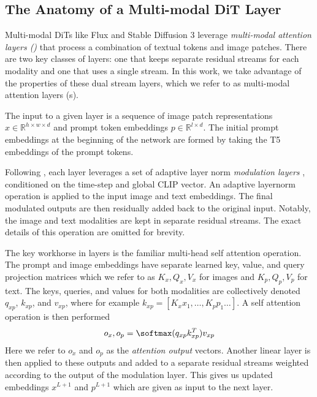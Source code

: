 
\subsection{The Anatomy of a Multi-modal DiT Layer}

Multi-modal DiTs like Flux and Stable Diffusion 3 leverage \textit{multi-modal attention layers (\layername)} that process a combination of textual tokens and image patches. There are two key classes of layers: one that keeps separate residual streams for each modality and one that uses a single stream. In this work, we take advantage of the properties of these dual stream layers, which we refer to as multi-modal attention layers (\layername s). 

The input to a given layer is a sequence of image patch representations $x \in \mathbb{R}^{h \times w \times d}$ and prompt token embeddings $p \in \mathbb{R}^{l \times d}$. The initial prompt embeddings at the beginning of the network are formed by taking the T5 \cite{raffel_exploring_2023} embeddings of the prompt tokens.

Following \cite{peebles_scalable_2023}, each \layername{} layer leverages a set of adaptive layer norm \textit{modulation layers}  \cite{xu_understanding_2019}, conditioned on the time-step and global CLIP vector. An adaptive layernorm operation is applied to the input image and text embeddings. 
The final modulated outputs are then residually added back to the original input. Notably, the image and text modalities are kept in separate residual streams. The exact details of this operation are omitted for brevity. 

The key workhorse in \layername{} layers is the familiar multi-head self attention operation. The prompt and image embeddings have separate learned key, value, and query projection matrices which we refer to as $K_x, Q_x, V_x$ for images and $K_p, Q_p, V_p$ for text. The keys, queries, and values for both modalities are collectively denoted $q_{xp}$, $k_{xp}$, and $v_{xp}$, where for example $k_{xp} = [K_x x_1, \dots, K_p p_1 \dots]$. 
A self attention operation is then performed 
\begin{equation}
    o_x, o_p = \softmax(q_{xp} k_{xp}^T) v_{xp}
\end{equation}
Here we refer to $o_x$ and $o_p$ as the \textit{attention output} vectors. Another linear layer is then applied to these outputs and added to a separate residual streams weighted according to the output of the modulation layer. This gives us updated embeddings $x^{L+1}$ and $p^{L + 1}$ which are given as input to the next layer. 

